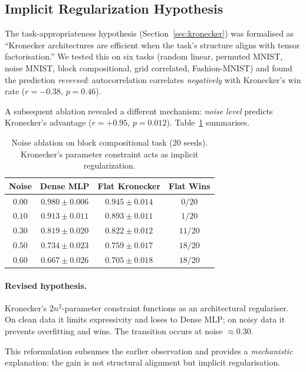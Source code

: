 \documentclass[11pt,a4paper]{article}
\begin{document}
\subsection{Implicit Regularization Hypothesis}
\label{sec:regularization}

The task-appropriateness hypothesis (Section~\ref{sec:kronecker}) was
formalised as ``Kronecker architectures are efficient when the task's
structure aligns with tensor factorisation.'' We tested this on six
tasks (random linear, permuted MNIST, noise MNIST, block compositional,
grid correlated, Fashion-MNIST) and found the prediction
\emph{reversed}: autocorrelation correlates \emph{negatively} with
Kronecker's win rate ($r = -0.38$, $p = 0.46$).

A subsequent ablation revealed a different mechanism: \emph{noise
level} predicts Kronecker's advantage ($r = +0.95$, $p = 0.012$).
Table~\ref{tab:noise-ablation} summarises.

\begin{table}[h]
\centering
\caption{Noise ablation on block compositional task (20 seeds).
Kronecker's parameter constraint acts as implicit regularization.}
\label{tab:noise-ablation}
\small
\begin{tabular}{cccc}
\toprule
Noise & Dense MLP & Flat Kronecker & Flat Wins \\
\midrule
$0.00$ & $0.980 \pm 0.006$ & $0.945 \pm 0.014$ & $0/20$ \\
$0.10$ & $0.913 \pm 0.011$ & $0.893 \pm 0.011$ & $1/20$ \\
$0.30$ & $0.819 \pm 0.020$ & $0.822 \pm 0.012$ & $11/20$ \\
$0.50$ & $0.734 \pm 0.023$ & $0.759 \pm 0.017$ & $18/20$ \\
$0.60$ & $0.667 \pm 0.026$ & $0.705 \pm 0.018$ & $18/20$ \\
\bottomrule
\end{tabular}
\end{table}

\paragraph{Revised hypothesis.}
Kronecker's $2n^2$-parameter constraint functions as an architectural
regulariser. On clean data it limits expressivity and loses to Dense
MLP; on noisy data it prevents overfitting and wins. The transition
occurs at noise $\approx 0.30$.

This reformulation subsumes the earlier observation and provides a
\emph{mechanistic} explanation: the gain is not structural alignment
but implicit regularisation.
\end{document}

